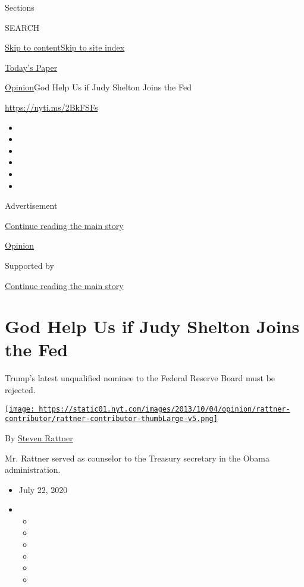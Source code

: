 Sections

SEARCH

\protect\hyperlink{site-content}{Skip to
content}\protect\hyperlink{site-index}{Skip to site index}

\href{https://myaccount.nytimes.com/auth/login?response_type=cookie\&client_id=vi}{}

\href{https://www.nytimes.com/section/todayspaper}{Today's Paper}

\href{/section/opinion}{Opinion}\textbar{}God Help Us if Judy Shelton
Joins the Fed

\href{https://nyti.ms/2BkFSFs}{https://nyti.ms/2BkFSFs}

\begin{itemize}
\item
\item
\item
\item
\item
\item
\end{itemize}

Advertisement

\protect\hyperlink{after-top}{Continue reading the main story}

\href{/section/opinion}{Opinion}

Supported by

\protect\hyperlink{after-sponsor}{Continue reading the main story}

\hypertarget{god-help-us-if-judy-shelton-joins-the-fed}{%
\section{God Help Us if Judy Shelton Joins the
Fed}\label{god-help-us-if-judy-shelton-joins-the-fed}}

Trump's latest unqualified nominee to the Federal Reserve Board must be
rejected.

\href{https://www.nytimes.com/topic/person/steven-rattner}{\texttt{[image: https://static01.nyt.com/images/2013/10/04/opinion/rattner-contributor/rattner-contributor-thumbLarge-v5.png]}}

By \href{https://www.nytimes.com/topic/person/steven-rattner}{Steven
Rattner}

Mr. Rattner served as counselor to the Treasury secretary in the Obama
administration.

\begin{itemize}
\item
  July 22, 2020
\item
  \begin{itemize}
  \item
  \item
  \item
  \item
  \item
  \item
  \end{itemize}
\end{itemize}

